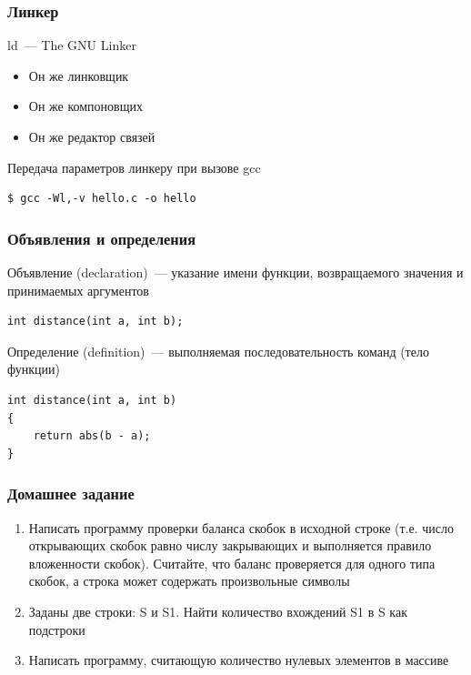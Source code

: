 \documentclass[aspectratio=169]{beamer}
\begin{document}
\begin{frame}[fragile]
    \frametitle{Линкер}

    ld~--- The GNU Linker

    \begin{itemize}
        \item Он же линковщик
        \item Он же компоновщих
        \item Он же редактор связей
    \end{itemize}

    \vspace{2em}

    Передача параметров линкеру при вызове gcc
    \begin{verbatim}
$ gcc -Wl,-v hello.c -o hello
    \end{verbatim}

\end{frame}

\begin{frame}[fragile]
    \frametitle{Объявления и определения}

    Объявление (declaration)~--- указание имени функции, возвращаемого значения и принимаемых аргументов

    \vspace{1em}

    \begin{verbatim}
int distance(int a, int b);
    \end{verbatim}

    \vspace{1em}

    Определение (definition)~--- выполняемая последовательность команд (тело функции)

    \vspace{1em}

    \begin{verbatim}
int distance(int a, int b)
{
    return abs(b - a);
}
    \end{verbatim}

\end{frame}

\begin{frame}
    \frametitle{Домашнее задание}

    \begin{enumerate}
        \item Написать программу проверки баланса скобок в исходной строке (т.е. число открывающих скобок равно числу закрывающих и выполняется правило вложенности скобок).
              Считайте, что баланс проверяется для одного типа скобок, а строка может содержать произвольные символы
        \item Заданы две строки: S и S1.
              Найти количество вхождений S1 в S как подстроки
        \item Написать программу, считающую количество нулевых элементов в массиве
    \end{enumerate}

\end{frame}
\end{document}
